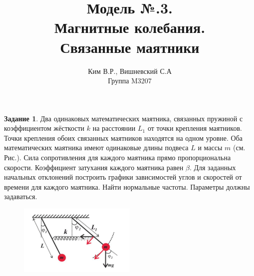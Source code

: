 \documentclass[a4paper,12pt]{article}
\title{Модель №.3. \\ Магнитные колебания. \\ Связанные маятники }
\author{Ким В.Р., Вишневский С.А \\ Группа M3207 }
\date{}
\theoremstyle{definition}
\newtheorem*{task}{Задание}\setlength{\parindent}{0pt}
\begin{document}
\maketitle

\begin{task}
    Два одинаковых математических маятника, связанных пружиной с коэффициентом 
    жёсткости \(k\) на расстоянии \(L_1\) от точки крепления маятников. 
    Точки крепления обоих связанных маятников находятся на одном уровне. 
    Оба математических маятника имеют одинаковые длины подвеса \(L\) и массы \(m\) 
    (см. Рис.). 
    Сила сопротивления для каждого маятника прямо пропорциональна скорости. 
    Коэффициент затухания каждого маятника равен \(\beta\). Для заданных начальных 
    отклонений построить графики зависимостей углов и скоростей от времени 
    для каждого маятника. Найти нормальные частоты. 
    Параметры должны задаваться.

    \begin{figure}[H]
        \centering
        \includegraphics[width=0.5\textwidth]{"4. Connected pendulum/task.png"}  
    \end{figure}

\end{task}
\end{document}
